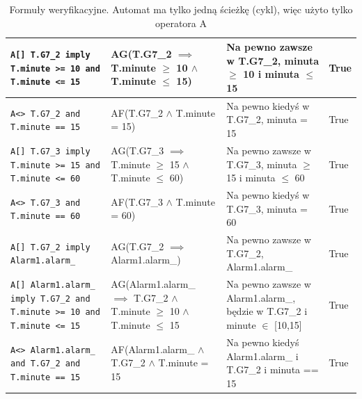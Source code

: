 \documentclass[12pt, a4paper]{article}
\begin{document}
\begin{landscape}
\begin{table}
\begin{tabularx}{\linewidth}{X|X|X|l}
            \texttt{A[] T.G7\_2 imply T.minute >= 10 and T.minute <= 15}                    & AG(T.G7\_2 $\implies$ T.minute $\ge$ 10 $ \wedge $ T.minute $\le$ 15)                           & Na pewno zawsze w T.G7\_2, minuta $\ge$ 10 i minuta $\le$ 15              & True \\ \hline
            \texttt{A<> T.G7\_2 and T.minute == 15}                                         & AF(T.G7\_2 $ \wedge $ T.minute = 15)                                                            & Na pewno kiedyś w T.G7\_2, minuta = 15                                    & True \\ \hline
            \texttt{A[] T.G7\_3 imply T.minute >= 15 and T.minute <= 60}                    & AG(T.G7\_3 $\implies$ T.minute $\ge$ 15 $ \wedge $ T.minute $\le$ 60)                           & Na pewno zawsze w T.G7\_3, minuta $\ge$ 15 i minuta $\le$ 60              & True \\ \hline
            \texttt{A<> T.G7\_3 and T.minute == 60}                                         & AF(T.G7\_3 $ \wedge $ T.minute = 60)                                                            & Na pewno kiedyś w T.G7\_3, minuta = 60                                    & True \\ \hline
            \texttt{A[] T.G7\_2 imply Alarm1.alarm\_}                                       & AG(T.G7\_2 $\implies$ Alarm1.alarm\_)                                                           & Na pewno zawsze w T.G7\_2, Alarm1.alarm\_                                 & True \\ \hline
            \texttt{A[] Alarm1.alarm\_ imply T.G7\_2 and T.minute >= 10 and T.minute <= 15} & AG(Alarm1.alarm\_ $\implies$ T.G7\_2 $ \wedge $ T.minute $\ge$ 10 $ \wedge $  T.minute $\le$ 15 & Na pewno zawsze w Alarm1.alarm\_, będzie w T.G7\_2 i minute $\in$ [10,15] & True \\ \hline
            \texttt{A<> Alarm1.alarm\_ and T.G7\_2 and T.minute == 15}                      & AF(Alarm1.alarm\_ $ \wedge $ T.G7\_2 $ \wedge $  T.minute = 15                                  & Na pewno kiedyś  Alarm1.alarm\_ i T.G7\_2 i minuta == 15                  & True \\
        \end{tabularx}
        \caption{Formuły weryfikacyjne. Automat ma tylko jedną ścieżkę (cykl), więc użyto tylko operatora A}
    \end{table}
\end{landscape}
\restoregeometry
\end{document}
